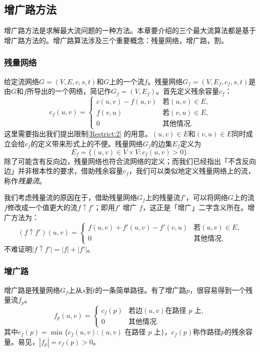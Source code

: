 \documentclass[a4paper]{ctexbook}
\begin{document}
  \subsection{增广路方法}\label{augmenting-path-method}
  增广路方法是求解最大流问题的一种方法。本章要介绍的三个最大流算法都是基于增广路方法的。增广路算法涉及三个重要概念：残量网络，增广路，割。
  \subsubsection*{残量网络}
  给定流网络$G=(V,E,c,s,t)$和$G$上的一个流$f$。残量网络$G_f=(V,E_f,c_f, s, t)$是由$G$和$f$所导出的一个网络，简记作$G_f=(V,E_f)$。首先定义残余容量$c_f$：
  \[
  c_f(u,v) =
  \begin{cases}
    c(u,v) - f(u,v) & \text{若$(u,v)\in E$,}\\
    f(v,u) & \text{若$(v,u)\in E$,} \\
    0 & \text{其他情况.}
  \end{cases}
  \]
  这里需要指出我们提出限制\ref{Restrict:2} 的用意。$(u,v)\in E$和$(v,u)\in E$同时成立会给$c_f$的定义带来形式上的不便。残量网络$G_f$的边集$E_f$定义为
  \[
  E_f = \{(u,v)\in V\times V\colon c_f(u,v)>0\}.
  \]
  除了可能含有反向边，残量网络也符合流网络的定义；而我们已经指出「不含反向边」并非根本性的要求，借助残余容量$c_f$，我们可以类似地定义残量网络上的流，称作\emph{残量流}。

  我们考虑残量流的原因在于，借助残量网络$G_f$上的残量流$f'$，可以将网络$G$上的流$f$修改成一个值更大的流$f\uparrow f'$；即用$f'$ 增广 $f$，这正是「增广」二字含义所在。增广方法为：
  \[
  (f\uparrow f')(u,v) =\begin{cases}
  f(u,v) + f'(u,v) - f'(v,u) & \text{若$(u,v)\in E$,} \\
  0 & \text{其他情况.}
\end{cases}
  \]
  不难证明$|f\uparrow f'| = |f| + |f'|$。
  \subsubsection{增广路}
  增广路是残量网络$G_f$上从$s$到$t$的一条简单路径。有了增广路$p$，很容易得到一个残量流$f_p$。
  \[
  f_p(u,v) =\begin{cases}
  c_f(p) & \text{若边$(u,v)$在路径 $p$ 上,}\\
  0 & \text{其他情况.}
\end{cases}
  \]
  其中$c_f(p) = \min\{c_f(u,v)\colon (u,v)\text{ 在路径 }p\text{ 上} \}$，$c_f(p)$称作路径$p$的残余容量。易见，$|f_p| = c_f(p) > 0$。
\end{document}
